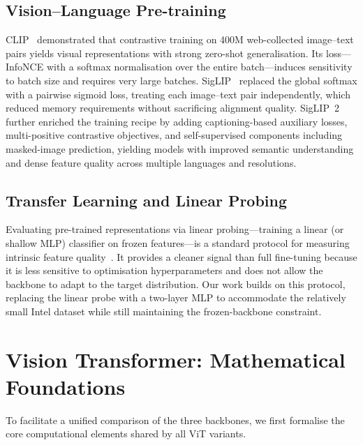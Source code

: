 \documentclass[journal]{IEEEtran}
\begin{document}
\subsection{Vision--Language Pre-training}
CLIP~\cite{radford2021clip} demonstrated that contrastive training on 400M web-collected
image–text pairs yields visual representations with strong zero-shot generalisation. Its
loss—InfoNCE with a softmax normalisation over the entire batch—induces sensitivity to
batch size and requires very large batches. SigLIP~\cite{zhai2023siglip} replaced the
global softmax with a pairwise sigmoid loss, treating each image–text pair independently,
which reduced memory requirements without sacrificing alignment quality. SigLIP~2~\cite{tschannen2025siglip2}
further enriched the training recipe by adding captioning-based auxiliary losses, multi-positive
contrastive objectives, and self-supervised components including masked-image prediction,
yielding models with improved semantic understanding and dense feature quality across multiple
languages and resolutions.

\subsection{Transfer Learning and Linear Probing}
Evaluating pre-trained representations via linear probing—training a linear (or shallow MLP)
classifier on frozen features—is a standard protocol for measuring intrinsic feature
quality~\cite{chen2020simclr, radford2021clip, oquab2023dinov2}. It provides a cleaner signal
than full fine-tuning because it is less sensitive to optimisation hyperparameters and does
not allow the backbone to adapt to the target distribution. Our work builds on this protocol,
replacing the linear probe with a two-layer MLP to accommodate the relatively small Intel
dataset while still maintaining the frozen-backbone constraint.

\section{Vision Transformer: Mathematical Foundations}
\label{sec:background}

To facilitate a unified comparison of the three backbones, we first formalise the core
computational elements shared by all ViT variants.
\end{document}

